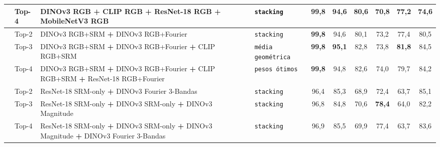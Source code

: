 \begin{table}[!htb]
{\begin{tabular}{@{}ll l l c c c c c c@{}}
 & Top-4 & DINOv3 RGB \textbf{+} CLIP RGB \textbf{+} ResNet-18 RGB \textbf{+} MobileNetV3 RGB & \texttt{stacking} & \textbf{99,8} & 94,6 & 80,6 & 70,8 & 77,2 & 74,6 \\
\midrule
{} & Top-2 & DINOv3 RGB+SRM \textbf{+} DINOv3 RGB+Fourier & \texttt{stacking} & \textbf{99,8} & 94,6 & 80,1 & 73,2 & 77,4 & 80,5 \\
 & Top-3 & DINOv3 RGB+SRM \textbf{+} DINOv3 RGB+Fourier \textbf{+} CLIP RGB+SRM & \texttt{média geométrica} & \textbf{99,8} & \textbf{95,1} & 82,8 & 73,8 & \textbf{81,8} & 84,5 \\
 & Top-4 & DINOv3 RGB+SRM \textbf{+} DINOv3 RGB+Fourier \textbf{+} CLIP RGB+SRM \textbf{+} ResNet-18 RGB+Fourier & \texttt{pesos ótimos} & \textbf{99,8} & 94,8 & 82,6 & 74,0 & 79,7 & 84,2 \\
\midrule
{} & Top-2 & ResNet-18 SRM-only \textbf{+} DINOv3 Fourier 3-Bandas & \texttt{stacking} & 96,4 & 85,3 & 68,9 & 72,4 & 63,7 & 85,1 \\
 & Top-3 & ResNet-18 SRM-only \textbf{+} DINOv3 SRM-only \textbf{+} DINOv3 Magnitude & \texttt{stacking} & 96,8 & 84,8 & 70,6 & \textbf{78,4} & 64,0 & 82,2 \\
 & Top-4 & ResNet-18 SRM-only \textbf{+} DINOv3 SRM-only \textbf{+} DINOv3 Magnitude \textbf{+} DINOv3 Fourier 3-Bandas & \texttt{stacking} & 96,9 & 85,5 & 69,9 & 77,4 & 63,7 & 83,6 \\
\bottomrule
\end{tabular}
}
\end{table}
